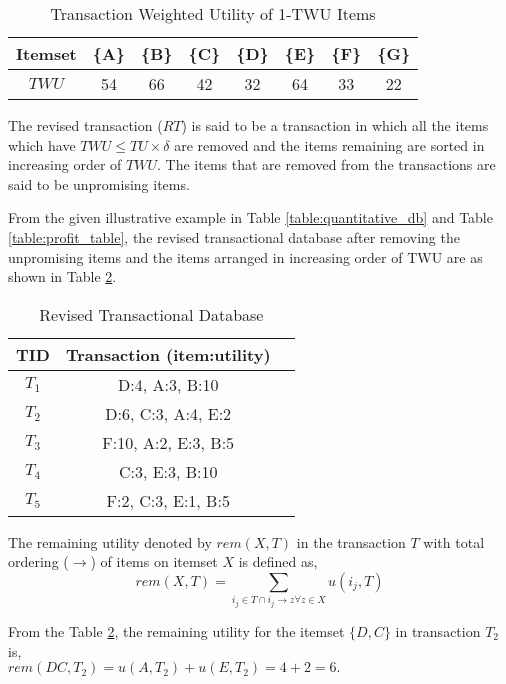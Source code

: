 \documentclass[11pt,openright]{report}
\begin{document}
\begin{table}
	\renewcommand{\arraystretch}{1.3}
	\caption{Transaction Weighted Utility of 1-TWU Items}
	\label{table:twu_items}
	\centering
	\begin{tabular}{|c||c|c|c|c|c|c|c|}
		\hline
		\bfseries Itemset & \bfseries \{A\} & \bfseries \{B\} & \bfseries \{C\} & \bfseries \{D\} & \bfseries \{E\} & \bfseries \{F\} & \bfseries \{G\}\\
		\hline
		$TWU$ & 54 & 66 & 42 & 32 & 64 & 33 & 22\\ \hline
	\end{tabular}
\end{table}

\begin{definition}
	The revised transaction ($RT$) is said to be a transaction in which all the items which have $TWU \le TU \times \delta$ are removed and the items remaining are sorted in increasing order of $TWU$. The items that are removed from the transactions are said to be unpromising items.
\end{definition}
From the given illustrative example in Table \ref{table:quantitative_db} and Table \ref{table:profit_table}, the revised transactional database after removing the unpromising items and the items arranged in increasing order of TWU are as shown in Table \ref{table:revisedDatabase}.

\begin{table}
	\renewcommand{\arraystretch}{1.3}
	\caption{Revised Transactional Database}
	\label{table:revisedDatabase}
	\centering
	\begin{tabular}{|c||c||c|}
		\hline
		\bfseries TID & \bfseries Transaction (item:utility)\\
		\hline\hline
		$T_1$ & D:4, A:3, B:10\\ \hline
		$T_2$ & D:6, C:3, A:4, E:2\\ \hline
		$T_3$ & F:10, A:2, E:3, B:5\\ \hline
		$T_4$ & C:3, E:3, B:10\\ \hline
		$T_5$ & F:2, C:3, E:1, B:5\\ \hline
	\end{tabular}
\end{table}

\begin{definition}
	The remaining utility denoted by $rem(X,T)$ in the transaction $T$ with total ordering ($\rightarrow$) of items on itemset $X$ is defined as,
	\begin{equation}
	rem(X,T) = \sum_{i_j \in T \cap i_j \rightarrow z \forall z \in X} u(i_j, T)
	\label{eq:remaining_utility}
	\end{equation}
\end{definition}
From the Table \ref{table:revisedDatabase}, the remaining utility for the itemset $\{D,C\}$ in transaction $T_2$ is,\\
\indent $rem(DC,T_2) = u(A,T_2) + u(E,T_2) = 4 + 2 = 6.$
\end{document}
